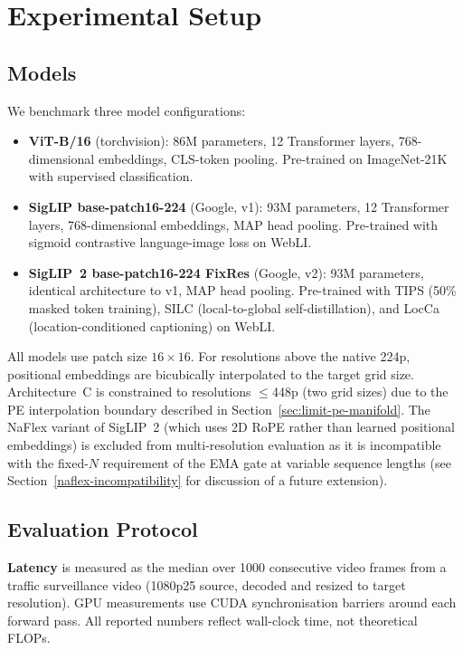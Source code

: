 \documentclass{article}
\begin{document}
\section{Experimental Setup}\label{experimental-setup}

\subsection{Models}\label{models}

We benchmark three model configurations:

\begin{itemize}
  \item \textbf{ViT-B/16} (torchvision): 86M parameters, 12 Transformer
    layers, 768-dimensional embeddings, CLS-token pooling. Pre-trained on
    ImageNet-21K with supervised classification.
  \item \textbf{SigLIP base-patch16-224} (Google, v1): 93M parameters,
    12 Transformer layers, 768-dimensional embeddings, MAP head pooling.
    Pre-trained with sigmoid contrastive language-image loss on WebLI.
  \item \textbf{SigLIP~2 base-patch16-224 FixRes} (Google, v2): 93M
    parameters, identical architecture to v1, MAP head pooling.
    Pre-trained with TIPS (50\% masked token training), SILC
    (local-to-global self-distillation), and LocCa
    (location-conditioned captioning) on WebLI.
\end{itemize}

All models use patch size $16{\times}16$. For resolutions above the
native 224p, positional embeddings are bicubically interpolated to the
target grid size. Architecture~C is constrained to resolutions
$\leq$448p (two grid sizes) due to the PE interpolation boundary
described in Section~\ref{sec:limit-pe-manifold}. The NaFlex variant of
SigLIP~2 (which uses 2D RoPE rather than learned positional embeddings)
is excluded from multi-resolution evaluation as it is incompatible with
the fixed-$N$ requirement of the EMA gate at variable sequence lengths
(see Section~\ref{naflex-incompatibility} for discussion of a future
extension).

\subsection{Evaluation Protocol}\label{evaluation-protocol}

\textbf{Latency} is measured as the median over 1000 consecutive video
frames from a traffic surveillance video (1080p25 source, decoded and
resized to target resolution). GPU measurements use CUDA synchronisation
barriers around each forward pass. All reported numbers reflect wall-clock
time, not theoretical FLOPs.
\end{document}
